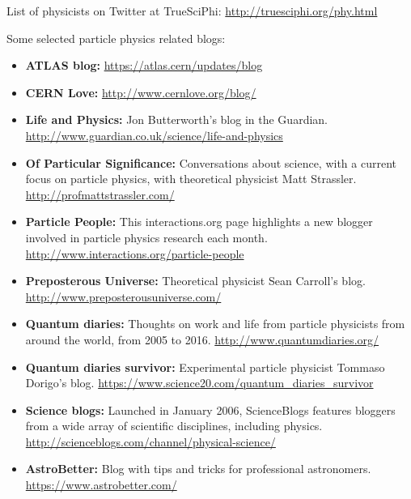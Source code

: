 List of physicists on Twitter at TrueSciPhi:
\url{http://truesciphi.org/phy.html}

Some selected particle physics related blogs:

\begin{itemize}
\item
  \textbf{ATLAS blog:} \url{https://atlas.cern/updates/blog}
\item
  \textbf{CERN Love:} \url{http://www.cernlove.org/blog/}
\item
  \textbf{Life and Physics:} Jon Butterworth's blog in the Guardian.
  \url{http://www.guardian.co.uk/science/life-and-physics}
\item
  \textbf{Of Particular Significance:} Conversations about science, with
  a current focus on particle physics, with theoretical physicist Matt
  Strassler. \url{http://profmattstrassler.com/}
\item
  \textbf{Particle People:} This interactions.org page highlights a new
  blogger involved in particle physics research each month.
  \url{http://www.interactions.org/particle-people}
\item
  \textbf{Preposterous Universe:} Theoretical physicist Sean Carroll's
  blog. \url{http://www.preposterousuniverse.com/}
\item
  \textbf{Quantum diaries:} Thoughts on work and life from particle
  physicists from around the world, from 2005 to 2016.
  \url{http://www.quantumdiaries.org/}
\item
  \textbf{Quantum diaries survivor:} Experimental particle physicist
  Tommaso Dorigo's blog.
  \url{https://www.science20.com/quantum_diaries_survivor}
\item
  \textbf{Science blogs:} Launched in January 2006, ScienceBlogs
  features bloggers from a wide array of scientific disciplines,
  including physics.
  \url{http://scienceblogs.com/channel/physical-science/}
\item
  \textbf{AstroBetter:} Blog with tips and tricks for professional
  astronomers. \url{https://www.astrobetter.com/}
\end{itemize}
